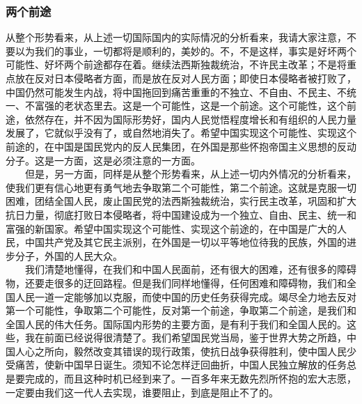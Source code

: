 \documentclass[cn,11pt,chinese]{elegantbook}
\def\myformat#1{\hfil\hfil #1}
\begin{document}
\subsubsection*{\myformat{两个前途}}
从整个形势看来，从上述一切国际国内的实际情况的分析看来，我请大家注意，不要以为我们的事业，一切都将是顺利的，美妙的。不，不是这样，事实是好坏两个可能性、好坏两个前途都存在着。继续法西斯独裁统治，不许民主改革；不是将重点放在反对日本侵略者方面，而是放在反对人民方面；即使日本侵略者被打败了，中国仍然可能发生内战，将中国拖回到痛苦重重的不独立、不自由、不民主、不统一、不富强的老状态里去。这是一个可能性，这是一个前途。这个可能性，这个前途，依然存在，并不因为国际形势好，国内人民觉悟程度增长和有组织的人民力量发展了，它就似乎没有了，或自然地消失了。希望中国实现这个可能性、实现这个前途的，在中国是国民党内的反人民集团，在外国是那些怀抱帝国主义思想的反动分子。这是一方面，这是必须注意的一方面。\\
　　但是，另一方面，同样是从整个形势看来，从上述一切内外情况的分析看来，使我们更有信心地更有勇气地去争取第二个可能性，第二个前途。这就是克服一切困难，团结全国人民，废止国民党的法西斯独裁统治，实行民主改革，巩固和扩大抗日力量，彻底打败日本侵略者，将中国建设成为一个独立、自由、民主、统一和富强的新国家。希望中国实现这个可能性、实现这个前途的，在中国是广大的人民，中国共产党及其它民主派别，在外国是一切以平等地位待我的民族，外国的进步分子，外国的人民大众。\\
　　我们清楚地懂得，在我们和中国人民面前，还有很大的困难，还有很多的障碍物，还要走很多的迂回路程。但是我们同样地懂得，任何困难和障碍物，我们和全国人民一道一定能够加以克服，而使中国的历史任务获得完成。竭尽全力地去反对第一个可能性，争取第二个可能性，反对第一个前途，争取第二个前途，是我们和全国人民的伟大任务。国际国内形势的主要方面，是有利于我们和全国人民的。这些，我在前面已经说得很清楚了。我们希望国民党当局，鉴于世界大势之所趋，中国人心之所向，毅然改变其错误的现行政策，使抗日战争获得胜利，使中国人民少受痛苦，使新中国早日诞生。须知不论怎样迂回曲折，中国人民独立解放的任务总是要完成的，而且这种时机已经到来了。一百多年来无数先烈所怀抱的宏大志愿，一定要由我们这一代人去实现，谁要阻止，到底是阻止不了的。\\
\end{document}
